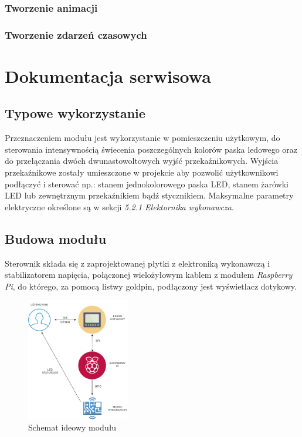 \documentclass[12pt, eng, twoside, openany, final]{mgr}
\begin{document}
        \subsection{Tworzenie animacji}
        \subsection{Tworzenie zdarzeń czasowych}
%
\chapter{Dokumentacja serwisowa}
\thispagestyle{fancy}
    \section{Typowe wykorzystanie}
    Przeznaczeniem modułu jest wykorzystanie w pomieszczeniu użytkowym, do sterowania intensywnością świecenia poszczególnych kolorów paska ledowego oraz do przełączania dwóch dwunastowoltowych wyjść przekaźnikowych. Wyjścia przekaźnikowe zostały umieszczone w projekcie aby pozwolić użytkownikowi podłączyć i sterować np.: stanem jednokolorowego paska LED, stanem żarówki LED lub zewnętrznym przekaźnikiem bądź stycznikiem. Maksymalne parametry elektryczne określone są w sekcji \emph{5.2.1 Elektornika wykonawcza}.
    \newpage
    
    \section{Budowa modułu}
    Sterownik składa się z zaprojektowanej płytki z elektroniką wykonawczą i stabilizatorem napięcia, połączonej wielożyłowym kablem z modułem \emph{Raspberry Pi}, do którego, za pomocą listwy goldpin, podłączony jest wyświetlacz dotykowy.
        \begin{figure}[H]
        \begin{center}
            \includegraphics[width=0.4\textwidth]{diagram.jpg}
            \caption{Schemat ideowy modułu}
        \end{center}
        \end{figure}
        
\end{document}
